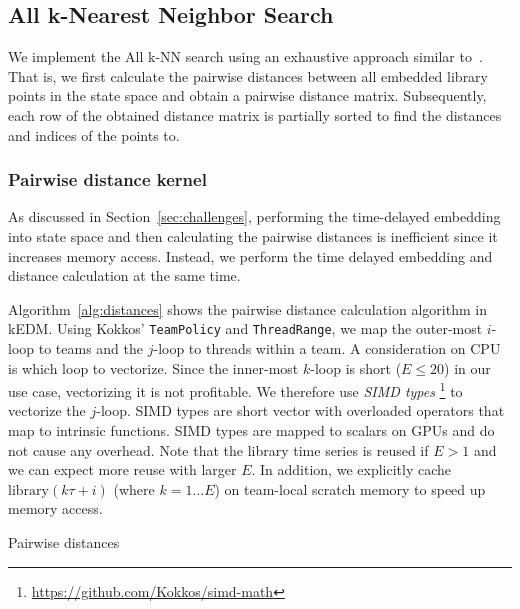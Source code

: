 \documentclass[sigconf]{acmart}
\begin{document}
\subsection{All k-Nearest Neighbor Search}

We implement the All k-NN search using an exhaustive approach similar
to~\cite{Garcia2008,Garcia2010}. That is, we first calculate the pairwise
distances between all embedded library points in the state space and obtain a
pairwise distance matrix. Subsequently, each row of the obtained distance
matrix is partially sorted to find the distances and indices of the points to.

\subsubsection{Pairwise distance kernel}
As discussed in Section~\ref{sec:challenges}, performing the time-delayed
embedding into state space and then calculating the pairwise distances is
inefficient since it increases memory access. Instead, we perform the time
delayed embedding and distance calculation at the same time.

Algorithm~\ref{alg:distances} shows the pairwise distance calculation
algorithm in kEDM\@. Using Kokkos' \texttt{TeamPolicy} and
\texttt{ThreadRange}, we map the outer-most $i$-loop to teams and the $j$-loop to
threads within a team. A consideration on CPU is which loop to vectorize.
Since the inner-most $k$-loop is short ($E \leq 20$) in our use case,
vectorizing it is not profitable. We therefore use \textit{SIMD types}
\footnote{\url{https://github.com/Kokkos/simd-math}} to vectorize the
$j$-loop. SIMD types are short vector with overloaded operators that map to
intrinsic functions. SIMD types are mapped to scalars on GPUs and do not cause
any overhead.
Note that the library time series is reused if $E > 1$ and we can expect
more reuse with larger $E$. In addition, we explicitly cache $\mathrm{library}
(k \tau + i)$ (where $k=1 \dots E$) on team-local scratch memory to speed up
memory access.

\begin{algorithm}
    \SetAlgoLined
    \DontPrintSemicolon
    \caption{Pairwise distances}%
    \label{alg:distances}
\end{algorithm}
\end{document}
